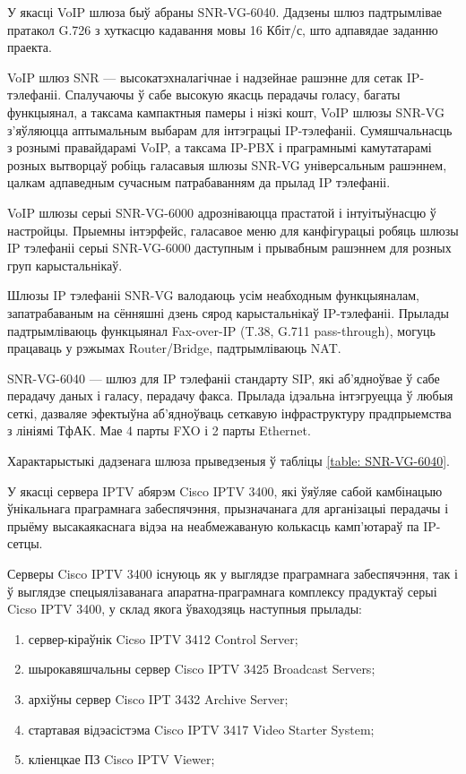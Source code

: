 У якасці VoIP шлюза быў абраны SNR-VG-6040. Дадзены шлюз падтрымлівае
пратакол G.726 з хуткасцю кадавання мовы 16 Кбіт/с, што адпавядае
заданню праекта.

VoIP шлюз SNR --- высокатэхналагічнае і надзейнае рашэнне для сетак IP-тэлефаніі. Спалучаючы ў сабе высокую якасць перадачы голасу, багаты функцыянал, а таксама кампактныя памеры і нізкі кошт, VoIP шлюзы SNR-VG з'яўляюцца аптымальным выбарам для інтэграцыі IP-тэлефаніі. Сумяшчальнасць з рознымі правайдарамі VoIP, а таксама IP-PBX і праграмнымі камутатарамі розных вытворцаў робіць галасавыя шлюзы SNR-VG універсальным рашэннем, цалкам адпаведным сучасным патрабаванням да прылад IP тэлефаніі.

VoIP шлюзы серыі SNR-VG-6000 адрозніваюцца прастатой і інтуітыўнасцю ў настройцы. Прыемны інтэрфейс, галасавое меню для канфігурацыі робяць шлюзы IP тэлефаніі серыі SNR-VG-6000 даступным і прывабным рашэннем для розных груп карыстальнікаў.

Шлюзы IP тэлефаніі SNR-VG валодаюць усім неабходным функцыяналам, запатрабаваным на сённяшні дзень сярод карыстальнікаў IP-тэлефаніі. Прылады падтрымліваюць функцыянал Fax-over-IP (T.38, G.711 pass-through), могуць працаваць у рэжымах Router/Bridge, падтрымліваюць NAT.

SNR-VG-6040 --- шлюз для IP тэлефаніі стандарту SIP, які аб'ядноўвае ў сабе перадачу даных і галасу, перадачу факса. Прылада ідэальна інтэгруецца ў любыя сеткі, дазваляе эфектыўна аб'ядноўваць сеткавую інфраструктуру прадпрыемства з лініямі ТфАK. Мае 4 парты FXO і 2 парты Ethernet.

Характарыстыкі дадзенага шлюза прыведзеныя ў табліцы
\ref{table: SNR-VG-6040}.

У якасці сервера IPTV абярэм Cisco IPTV 3400, які ўяўляе
сабой камбінацыю ўнікальнага праграмнага забеспячэння, прызначанага для
арганізацыі перадачы і прыёму высакаякаснага відэа на неабмежаваную колькасць камп'ютараў па IP-сетцы.

Серверы Cisco IPTV 3400 існуюць як у выглядзе праграмнага забеспячэння, так і ў
выглядзе спецыялізаванага апаратна-праграмнага комплексу прадуктаў серыі Cicso IPTV 3400, у склад якога ўваходзяць наступныя прылады:
\begin{enumerate}
    \item сервер-кіраўнік Cicso IPTV 3412 Control Server;
    \item шырокавяшчальны сервер Cisco IPTV 3425 Broadcast Servers;
    \item архіўны сервер Cisco IPT 3432 Archive Server;
    \item стартавая відэасістэма Cisco IPTV 3417 Video Starter System;
    \item кліенцкае ПЗ Cisco IPTV Viewer;
\end{enumerate}

